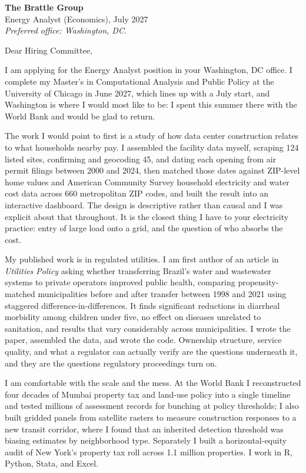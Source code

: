 


\textbf{The Brattle Group} \\
Energy Analyst (Economics), July 2027 \\
\textit{Preferred office: Washington, DC.}

\vspace{8pt}

Dear Hiring Committee,

I am applying for the Energy Analyst position in your Washington, DC office. I complete my Master's in Computational Analysis and Public Policy at the University of Chicago in June 2027, which lines up with a July start, and Washington is where I would most like to be: I spent this summer there with the World Bank and would be glad to return.

The work I would point to first is a study of how data center construction relates to what households nearby pay. I assembled the facility data myself, scraping 124 listed sites, confirming and geocoding 45, and dating each opening from air permit filings between 2000 and 2024, then matched those dates against ZIP-level home values and American Community Survey household electricity and water cost data across 660 metropolitan ZIP codes, and built the result into an interactive dashboard. The design is descriptive rather than causal and I was explicit about that throughout. It is the closest thing I have to your electricity practice: entry of large load onto a grid, and the question of who absorbs the cost.

My published work is in regulated utilities. I am first author of an article in \textit{Utilities Policy} asking whether transferring Brazil's water and wastewater systems to private operators improved public health, comparing propensity-matched municipalities before and after transfer between 1998 and 2021 using staggered difference-in-differences. It finds significant reductions in diarrheal morbidity among children under five, no effect on diseases unrelated to sanitation, and results that vary considerably across municipalities. I wrote the paper, assembled the data, and wrote the code. Ownership structure, service quality, and what a regulator can actually verify are the questions underneath it, and they are the questions regulatory proceedings turn on.

I am comfortable with the scale and the mess. At the World Bank I reconstructed four decades of Mumbai property tax and land-use policy into a single timeline and tested millions of assessment records for bunching at policy thresholds; I also built gridded panels from satellite rasters to measure construction responses to a new transit corridor, where I found that an inherited detection threshold was biasing estimates by neighborhood type. Separately I built a horizontal-equity audit of New York's property tax roll across 1.1 million properties. I work in R, Python, Stata, and Excel.

